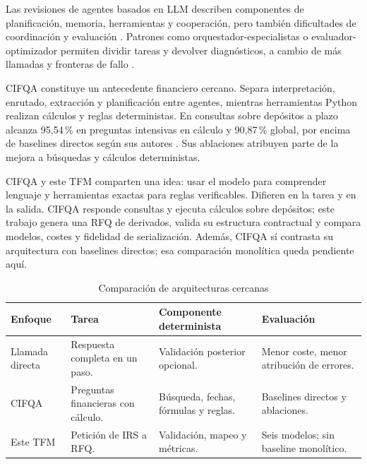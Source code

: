 Las revisiones de agentes basados en LLM describen componentes de planificación, memoria, herramientas y cooperación, pero también dificultades de coordinación y evaluación \citep{wang2024agentsurvey,mialon2024augmented}. Patrones como orquestador-especialistas o evaluador-optimizador permiten dividir tareas y devolver diagnósticos, a cambio de más llamadas y fronteras de fallo \citep{anthropic-effective-agents}.

CIFQA constituye un antecedente financiero cercano. Separa interpretación, enrutado, extracción y planificación entre agentes, mientras herramientas Python realizan cálculos y reglas deterministas. En consultas sobre depósitos a plazo alcanza 95,54\,\% en preguntas intensivas en cálculo y 90,87\,\% global, por encima de baselines directos según sus autores \citep{parekh2026cifqa}. Sus ablaciones atribuyen parte de la mejora a búsquedas y cálculos deterministas.

CIFQA y este TFM comparten una idea: usar el modelo para comprender lenguaje y herramientas exactas para reglas verificables. Difieren en la tarea y en la salida. CIFQA responde consultas y ejecuta cálculos sobre depósitos; este trabajo genera una RFQ de derivados, valida su estructura contractual y compara modelos, costes y fidelidad de serialización. Además, CIFQA sí contrasta su arquitectura con baselines directos; esa comparación monolítica queda pendiente aquí.

\begin{table}[H]
\centering
\small
\caption{Comparación de arquitecturas cercanas}
\label{tab:arquitecturas_cercanas}
\begin{tabular}{|P{2.8cm}|P{3.5cm}|P{3.6cm}|P{3.8cm}|}
\hline
\textbf{Enfoque} & \textbf{Tarea} & \textbf{Componente determinista} & \textbf{Evaluación} \\
\hline
Llamada directa & Respuesta completa en un paso. & Validación posterior opcional. & Menor coste, menor atribución de errores. \\
\hline
CIFQA & Preguntas financieras con cálculo. & Búsqueda, fechas, fórmulas y reglas. & Baselines directos y ablaciones. \\
\hline
Este TFM & Petición de IRS a RFQ. & Validación, mapeo y métricas. & Seis modelos; sin baseline monolítico. \\
\hline
\end{tabular}
\end{table}

